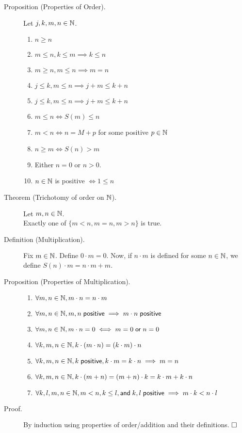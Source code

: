 \documentclass[letterpaper,11pt]{article}
\begin{document}
\begin{description}
\item[Proposition (Properties of Order).] Let $j,k,m,n\in\mathbb{N}$.
  \begin{enumerate}[(O1)]
  \item $n\ge n$
  \item $m\le n, k\le m\implies k\le n$
  \item $m\ge n, m\le n\implies m=n$
  \item $j\le k, m\le n\implies j+m\le k+n$
  \item $j\le k, m\le n\implies j+m\le k+n$
  \item $m\le n\iff S(m)\le n$
  \item $m<n\iff n=M+p$ for some positive $p\in\mathbb{N}$
  \item $n\ge m\iff S(n)>m$
  \item Either $n=0$ or $n>0$.
  \item $n\in\mathbb{N}$ is positive $\iff 1\le n$
  \end{enumerate}

\item[Theorem (Trichotomy of order on $\mathbb{N}$).] Let $m,n\in\mathbb{N}$.\\
    Exactly one of $\{m<n,m=n,m>n\}$ is true.

\item[Definition (Multiplication).] Fix $m\in\mathbb{N}$. Define $0\cdot m=0$.
    Now, if $n\cdot m$ is defined for some $n\in\mathbb{N}$,
    we define $S(n)\cdot m = n\cdot m + m$.

\item[Proposition (Properties of Multiplication).]\mbox{}
  \begin{enumerate}[(M1)]
  \item $\forall m,n\in\mathbb{N}, m\cdot n = n\cdot m$
  \item $\forall m,n\in\mathbb{N}, m,n\;\mathsf{positive} \implies m\cdot n\;\mathsf{positive}$
  \item $\forall m,n\in\mathbb{N}, m\cdot n = 0 \iff m=0\;\mathsf{or}\;n=0$
  \item $\forall k,m,n\in\mathbb{N}, k\cdot(m\cdot n) = (k\cdot m)\cdot n$
  \item $\forall k,m,n\in\mathbb{N}, k\;\mathsf{positive}, k\cdot m = k\cdot n\implies m=n$
  \item $\forall k,m,n\in\mathbb{N}, k\cdot(m+n) = (m+n)\cdot k = k\cdot m+k\cdot n$
  \item $\forall k,l,m,n\in\mathbb{N}, m<n, k\le l, \mathsf{and}\;
      k,l\;\mathsf{positive}\implies m\cdot k<n\cdot l$
  \end{enumerate}

\item[Proof.] By induction using properties of order/addition
    and their definitions. $\hfill\square$
\end{description}
\end{document}
